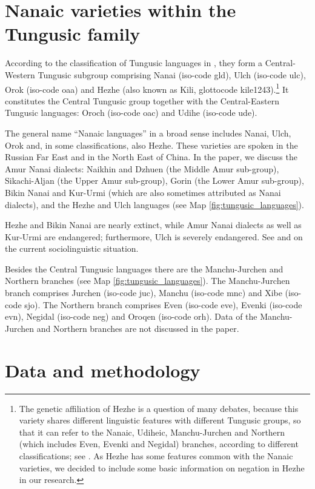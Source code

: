 \documentclass[output=paper]{langscibook}
\begin{document}
\section{Nanaic varieties within the Tungusic family}\label{sec:T2}

According to the classification of Tungusic languages in \citet{doerfer1978a}, they form a Central-Western Tungusic subgroup comprising Nanai (iso-code gld), Ulch (iso-code ulc), Orok (iso-code oaa) and Hezhe (also known as Kili, glottocode kile1243).\footnote{The genetic affiliation of Hezhe is a question of many debates, because this variety shares different linguistic features with different Tungusic groups, so that it can refer to the Nanaic, Udiheic, Manchu-Jurchen and Northern (which includes Even, Evenki and Negidal) branches, according to different classifications; see \citet{hoelzl2017a}. As Hezhe has some features common with the Nanaic varieties, we decided to include some basic information on negation in Hezhe in our research.} It constitutes the Central Tungusic group together with the Central-Eastern Tungusic languages: Oroch (iso-code oac) and Udihe (iso-code ude).

The general name “Nanaic languages” in a broad sense includes Nanai, Ulch, Orok and, in some classifications, also Hezhe. These varieties are spoken in the Russian Far East and in the North East of China. In the paper, we discuss the Amur Nanai dialects: Naikhin and Dzhuen (the Middle Amur sub-group), Sikachi-Aljan (the Upper Amur sub-group), Gorin (the Lower Amur sub-group), Bikin Nanai and Kur-Urmi (which are also sometimes attributed as Nanai dialects), and the Hezhe and Ulch languages (see Map \ref{fig:tungusic_languages}).

Hezhe and Bikin Nanai are nearly extinct, while Amur Nanai dialects as well as Kur-Urmi are endangered; furthermore, Ulch is severely endangered. See \citet{gerasimova2002a, sumbatova2016a} and \citet{kalinina2016a} on the current sociolinguistic situation.

Besides the Central Tungusic languages there are the Manchu-Jurchen and Northern branches (see Map \ref{fig:tungusic_languages}). The Manchu-Jurchen branch comprises Jurchen (iso-code juc), Manchu (iso-code mnc) and Xibe (iso-code sjo). The Northern branch comprises Even (iso-code eve), Evenki (iso-code evn), Negidal (iso-code neg) and Oroqen (iso-code orh). Data of the Manchu-Jurchen and Northern branches are not discussed in the paper.

\section{Data and methodology}\label{sec:T3}
\end{document}
